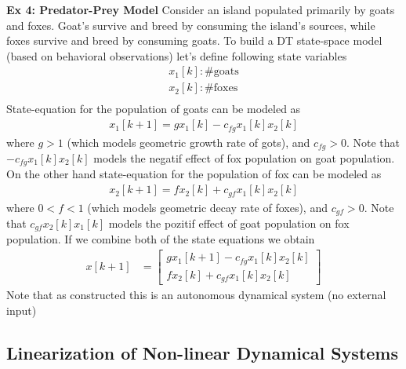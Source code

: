\documentclass[twoside]{article}
\begin{document}
\newpage

\textbf{Ex 4: Predator-Prey Model}
%
Consider an island populated primarily by goats and foxes. Goat's
survive and breed by consuming the island's sources, while foxes
survive and breed by consuming goats. To build a DT state-space model
(based on behavioral observations) let's define following state
variables
%
  \begin{align*}
    x_1[k] : \# \mathrm{goats} \\
    x_2[k] : \# \mathrm{foxes} \\
  \end{align*}
%
State-equation for the population of goats can be modeled as
%
  \begin{align*}
    x_1[k+1] = g x_1[k] - c_{fg} x_1[k] x_2[k] 
  \end{align*}
%
where $g > 1$ (which models geometric growth rate of gots), and
$c_{fg} > 0$. Note that $- c_{fg} x_1[k] x_2[k] $ models the negatif
effect of fox population on goat population. On the other hand 
state-equation for the population of fox can be modeled as
%
  \begin{align*}
    x_2[k+1] = f x_2[k] + c_{gf} x_1[k] x_2[k] 
  \end{align*}
%
where $0 < f < 1$ (which models geometric decay rate of foxes), and
$c_{gf} > 0$. Note that $c_{gf} x_2[k] x_1[k] $ models the pozitif
effect of goat population on fox population. If we combine both of the 
state equations we obtain
%
\begin{align*}
	x[k+1] &= \left[ \begin{array}{c} g x_1[k+1] - c_{fg} x_1[k] x_2[k]   \\ 
                          f x_2[k] + c_{gf} x_1[k] x_2[k]  \end{array} \right] 
\end{align*}
%
Note that as constructed this is an autonomous dynamical system (no
external input)

\subsection{Linearization of Non-linear Dynamical Systems}
\end{document}
